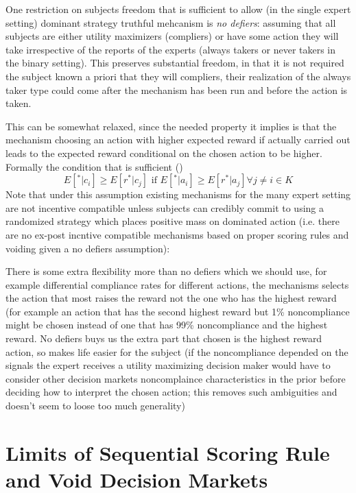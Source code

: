 One restriction on subjects freedom that is sufficient to allow (in the single expert setting) dominant strategy truthful mehcanism is \emph{no defiers}: assuming that all subjects are either utility maximizers (compliers) or have some action they will take irrespective of the reports of the experts (always takers or never takers in the binary setting).
This preserves substantial freedom, in that it is not required the subject known a priori that they will compliers, their realization of the always taker type could come after the mechanism has been run and before the action is taken. 

This can be somewhat relaxed, since the needed property it implies is that the mechanism choosing an action with higher expected reward if actually carried out leads to the expected reward conditional on the chosen action to be higher. Formally the condition that is sufficient ()
$$E[ ^{*}|c_i]  \geq E[ r^{*}|c_j] \text{ if }E[ ^{*}|a_i]  \geq E[ r^{*}|a_j]  \forall j \neq i \in K$$
Note that under this assumption existing mechanisms for the many expert setting are not incentive compatible unless subjects can credibly commit to using a randomized strategy which places positive mass on dominated action (i.e. there are no ex-post incntive compatible mechanisms based on proper scoring rules and voiding given a no defiers assumption):



There is some extra flexibility more than no defiers which we should use, for example differential compliance rates for different actions, the mechanisms selects the action that most raises the reward not the one who has the highest reward (for example an action that has the second highest reward but 1\% noncompliance might be chosen instead of one  that has 99\% noncompliance and the highest reward. No defiers buys us the extra part that chosen is the highest reward action, so makes life easier for the subject (if the noncompliance depended on the signals the expert receives a utility maximizing decision maker would have to consider other decision markets noncomplaince characteristics in the prior before deciding how to interpret the chosen action; this removes such ambiguities and doesn't seem to loose too much generality)



\section{Limits of Sequential Scoring Rule and Void Decision Markets}

